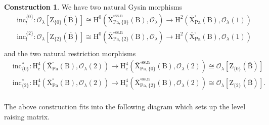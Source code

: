 \documentclass[10pt]{amsart}
\numberwithin{equation}{section}
\theoremstyle{definition}
\newtheorem{construction}[equation]{Construction}
\def\Pa{\mathrm{Pa}}
\def\calO{\mathcal{O}}
\def\rmc{\mathrm{c}}
\def\rmB{\mathrm{B}}
\def\rmH{\mathrm{H}}
\def\rmX{\mathrm{X}}
\def\rmZ{\mathrm{Z}}
\begin{document}
\begin{construction}\label{ss-cycle-class}
We have two natural Gysin morphisms
\begin{equation}\label{Tate-inj}
\begin{aligned}
&\mathrm{inc}^{\{0\}}_{!}: \calO_{\lambda}[\rmZ_{\{0\}}(\overline{\rmB})]\cong\rmH^{0}(\overline{\rmX}^{\square\mathrm{ss.n}}_{\Pa, \{0\}}(\rmB), \calO_{\lambda})\rightarrow  \rmH^{2}(\overline{\rmX}^{\square}_{\Pa}(\rmB), \calO_{\lambda}(1))\\
&\mathrm{inc}^{\{2\}}_{!}: \calO_{\lambda}[\rmZ_{\{2\}}(\overline{\rmB})]\cong \rmH^{0}(\overline{\rmX}^{\square\mathrm{ss.n}}_{\Pa, \{2\}}(\rmB), \calO_{\lambda}) \rightarrow  \rmH^{2}(\overline{\rmX}^{\square}_{\Pa}(\rmB), \calO_{\lambda}(1))\\
\end{aligned}
\end{equation}
and the two natural restriction morphisms
\begin{equation}\label{Tate-surj}
\begin{aligned}
&\mathrm{inc}^{\ast}_{\{0\}}: \rmH^{4}_{\rmc}(\overline{\rmX}^{\square}_{\Pa}(\rmB), \calO_{\lambda}(2))\rightarrow  \rmH^{4}_{\rmc}(\overline{\rmX}^{\square\mathrm{ss.n}}_{\Pa, \{0\}}(\rmB), \calO_{\lambda}(2)) \cong \calO_{\lambda}[\rmZ_{\{0\}}(\overline{\rmB})] \\
&\mathrm{inc}^{\ast}_{\{2\}}: \rmH^{4}_{\rmc}(\overline{\rmX}^{\square}_{\Pa}(\rmB), \calO_{\lambda}(2))\rightarrow  \rmH^{4}_{\rmc}(\overline{\rmX}^{\square\mathrm{ss.n}}_{\Pa, \{2\}}(\rmB), \calO_{\lambda}(2))\cong \calO_{\lambda}[\rmZ_{\{2\}}(\overline{\rmB})].\\
\end{aligned}
\end{equation}
\end{construction}
The above construction fits into the following diagram which sets up the level raising matrix.
\end{document}
